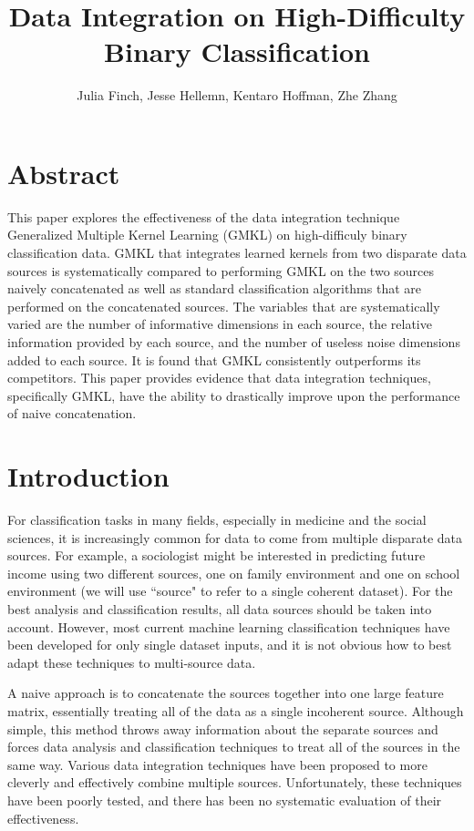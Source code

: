 \documentclass{article}
\begin{document}
\title{Data Integration on High-Difficulty Binary Classification}
\author{Julia Finch, Jesse Hellemn, Kentaro Hoffman, Zhe Zhang}
\maketitle


\section*{Abstract}

This paper explores the effectiveness of the data integration technique
Generalized Multiple Kernel Learning (GMKL) on high-difficuly binary
classification data. GMKL that integrates learned kernels from two disparate
data sources is systematically compared to performing GMKL on the two sources
naively concatenated as well as standard classification algorithms that are
performed on the concatenated sources. The variables that are systematically
varied are the number of informative dimensions in each source, the relative
information provided by each source, and the number of useless noise dimensions
added to each source. It is found that GMKL consistently outperforms its
competitors. This paper provides evidence that data integration techniques,
specifically GMKL, have the ability to drastically improve upon the performance
of naive concatenation.

\section*{Introduction}
For classification tasks in many fields, especially in medicine and the social
sciences, it is increasingly common for data to come from multiple disparate
data sources. For example, a sociologist might be interested in predicting
future income using two different sources, one on family environment and one on
school environment (we will use ``source" to refer to a single coherent
dataset). For the best analysis and classification results, all data sources
should be taken into account. However, most current machine learning
classification techniques have been developed for only single dataset inputs,
and it is not obvious how to best adapt these techniques to multi-source data.

A naive approach is to concatenate the sources together into one large feature
matrix, essentially treating all of the data as a single incoherent source.
Although simple, this method throws away
information about the separate sources and forces data analysis and
classification techniques to treat all of the sources in the same way. Various
data integration techniques have been proposed to more cleverly and effectively
combine multiple sources. Unfortunately, these techniques have been poorly
tested, and there has been no systematic evaluation of their effectiveness.
\end{document}
